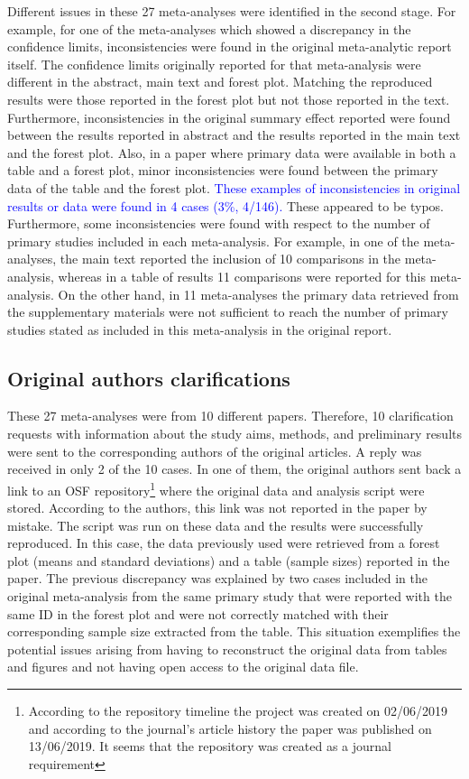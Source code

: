 \documentclass[
  ,man,floatsintext]{apa6}
\begin{document}
Different issues in these 27 meta-analyses were identified in the second stage. For example, for one of the meta-analyses which showed a discrepancy in the confidence limits, inconsistencies were found in the original meta-analytic report itself. The confidence limits originally reported for that meta-analysis were different in the abstract, main text and forest plot. Matching the reproduced results were those reported in the forest plot but not those reported in the text. Furthermore, inconsistencies in the original summary effect reported were found between the results reported in abstract and the results reported in the main text and the forest plot. Also, in a paper where primary data were available in both a table and a forest plot, minor inconsistencies were found between the primary data of the table and the forest plot. \textcolor{blue}{These examples of inconsistencies in original results or data were found in 4 cases (3\%, 4/146).} These appeared to be typos.
Furthermore, some inconsistencies were found with respect to the number of primary studies included in each meta-analysis. For example, in one of the meta-analyses, the main text reported the inclusion of 10 comparisons in the meta-analysis, whereas in a table of results 11 comparisons were reported for this meta-analysis. On the other hand, in 11 meta-analyses the primary data retrieved from the supplementary materials were not sufficient to reach the number of primary studies stated as included in this meta-analysis in the original report.

\hypertarget{original-authors-clarifications}{%
\subsection{Original authors clarifications}\label{original-authors-clarifications}}

These 27 meta-analyses were from 10 different papers. Therefore, 10 clarification requests with information about the study aims, methods, and preliminary results were sent to the corresponding authors of the original articles. A reply was received in only 2 of the 10 cases.
In one of them, the original authors sent back a link to an OSF repository\footnote{According to the repository timeline the project was created on 02/06/2019 and according to the journal's article history the paper was published on 13/06/2019. It seems that the repository was created as a journal requirement} where the original data and analysis script were stored. According to the authors, this link was not reported in the paper by mistake. The script was run on these data and the results were successfully reproduced. In this case, the data previously used were retrieved from a forest plot (means and standard deviations) and a table (sample sizes) reported in the paper. The previous discrepancy was explained by two cases included in the original meta-analysis from the same primary study that were reported with the same ID in the forest plot and were not correctly matched with their corresponding sample size extracted from the table. This situation exemplifies the potential issues arising from having to reconstruct the original data from tables and figures and not having open access to the original data file.
\end{document}
